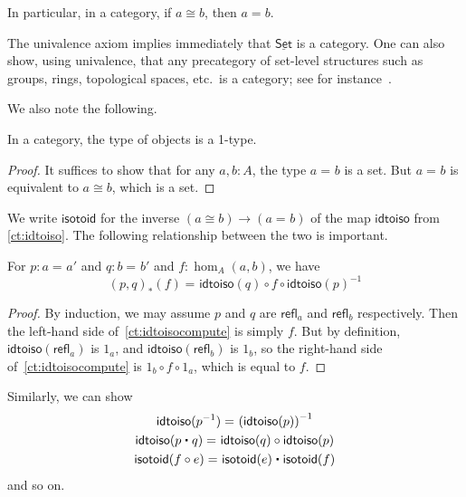\documentclass{amsart}
\newcommand{\id}[3][]{\ensuremath{#2 =_{#1} #3}\xspace}
\newcommand{\refl}[1]{\ensuremath{\mathsf{refl}_{#1}}\xspace}
\newcommand{\ct}{\mathrel{\raisebox{.5ex}{$\centerdot$}}}
\newcommand{\opp}[1]{\mathord{{#1}^{-1}}}
\let\rev\opp
\newcommand{\trans}[2]{\ensuremath{{#1}_{*}\!\left({#2}\right)}\xspace}
\renewcommand{\set}{\ensuremath{\mathsf{Set}}\xspace}
\newcommand{\uset}{\ensuremath{\underline{\set}}\xspace}
\theoremstyle{definition}
\theoremstyle{remark}
\numberwithin{equation}{section}
\newcommand{\inv}[1]{{#1}^{-1}}
\newcommand{\idtoiso}{\ensuremath{\mathsf{idtoiso}}\xspace}
\newcommand{\isotoid}{\ensuremath{\mathsf{isotoid}}\xspace}
\begin{document}
In particular, in a category, if $a\cong b$, then $a=b$.

\begin{eg}\label{ct:eg:set}
  The univalence axiom implies immediately that \uset is a category.
  One can also show, using univalence, that any precategory of set-level structures such as groups, rings, topological spaces, etc.\ is a category; see for instance~\cite{dc:isoeq}.
\end{eg}

We also note the following.

\begin{lem}\label{ct:obj-1type}
  In a category, the type of objects is a 1-type.
\end{lem}
\begin{proof}
  It suffices to show that for any $a,b:A$, the type $\id a b$ is a set.
  But $\id a b$ is equivalent to $a \cong b$, which is a set.
\end{proof}

We write $\isotoid$ for the inverse $(a\cong b) \to (\id a b)$ of the map $\idtoiso$ from \autoref{ct:idtoiso}.
The following relationship between the two is important.

\begin{lem}\label{ct:idtoiso-trans}
  For $p:\id a a'$ and $q:\id b b'$ and $f:\hom_A(a,b)$, we have
  \begin{equation}\label{ct:idtoisocompute}
    \id{\trans{(p,q)}{f}}
    {\idtoiso(q)\circ f \circ \inv{\idtoiso(p)}}
  \end{equation}
\end{lem}
\begin{proof}
  By induction, we may assume $p$ and $q$ are $\refl a$ and $\refl b$ respectively.
Then the left-hand side of~\eqref{ct:idtoisocompute} is simply $f$.
  But by definition, $\idtoiso(\refl a)$ is $1_a$, and $\idtoiso(\refl b)$ is $1_b$, so the right-hand side of~\eqref{ct:idtoisocompute} is $1_b\circ f\circ 1_a$, which is equal to $f$.
\end{proof}

Similarly, we can show
\begin{gather}
  \id{\idtoiso(\rev p)}{\inv {(\idtoiso(p))}}\\
  \id{\idtoiso(p\ct q)}{\idtoiso(q)\circ \idtoiso(p)}\\
  \id{\isotoid(f\circ e)}{\isotoid(e)\ct \isotoid(f)}
\end{gather}
and so on.
\end{document}
